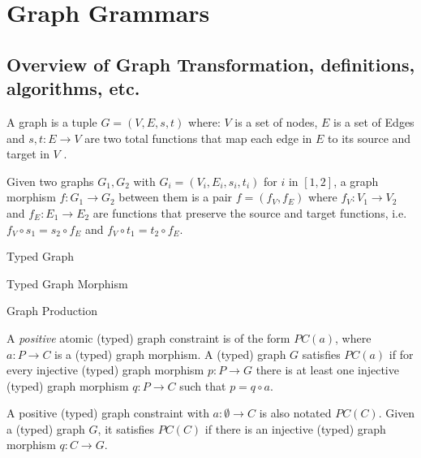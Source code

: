 \chapter{Graph Grammars}

\section{Overview of Graph Transformation, definitions, algorithms, etc.}

\begin{intuition}
\end{intuition}

\begin{definition}[Graph] A graph is a tuple $G = (V,E,s,t)$ where: $V$ is a set of nodes, $E$ is a set of Edges and $s,t : E \rightarrow V$ are two total functions that map each edge in $E$ to its source and target in $V$%
.

\end{definition}

\begin{example}[Graph]
\end{example}

\begin{definition} Given two graphs $G_1,G_2$ with $G_i = (V_i, E_i, s_i, t_i)$ for $i$ in $[1,2]$, a graph morphism $f : G_1 \rightarrow G_2$ between them is a pair $f = (f_V,f_E)$ where $f_V : V_1 \rightarrow V_2$ and $f_E : E_1 \rightarrow E_2$ are functions that preserve the source and target functions, i.e. $f_V \circ s_1 = s_2 \circ f_E$ and $f_V \circ t_1 = t_2 \circ f_E$.
\end{definition}

\begin{definition}{Typed Graph}
\end{definition}

\begin{definition}{Typed Graph Morphism}
\end{definition}

\begin{definition}{Graph Production}
\end{definition}

\begin{definition} A \emph{positive} atomic (typed) graph constraint is of the form $PC(a)$, where $a : P \rightarrow C$ is a (typed) graph morphism. A (typed) graph $G$ satisfies $PC(a)$ if for every injective (typed) graph morphism $p : P \rightarrow G$ there is at least one injective (typed) graph morphism $q : P \rightarrow C$ such that $p = q \circ a$.

  A positive (typed) graph constraint with $a : \emptyset \rightarrow C$ is also notated $PC(C)$. Given a (typed) graph $G$, it satisfies $PC(C)$ if there is an injective (typed) graph morphism $q : C \rightarrow  G$.


\end{definition}

